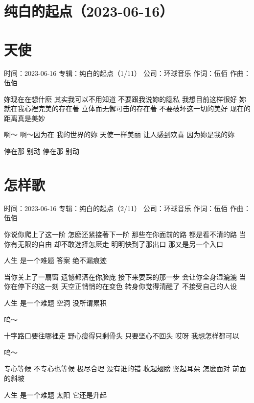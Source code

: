 \documentclass[UTF8,a4paper,oneside,twocolumn,12pt]{ctexbook}
\newcommand{\infopair}[2]{\textbullet #1：#2}
\newcommand{\zc}[1][伍佰]{\infopair{作词}{#1}}
\newcommand{\zq}[1][伍佰]{\infopair{作曲}{#1}}
\newcommand{\zj}[1]{\infopair{专辑}{#1}}
\newcommand{\sj}[1]{\infopair{时间}{#1}}
\newcommand{\gs}[1]{\infopair{公司}{#1}}
\newenvironment{info}{\begin{flushleft}\kaishu
	}
	{\end{flushleft}\normalsize\yahei\par}
\newenvironment{lyric}{
	}
{}
\begin{document}
\section*{纯白的起点（2023-06-16）}%
\section{天使}
\begin{info}
	\sj{2023-06-16}
	\zj{纯白的起点（1/11）}
	\gs{环球音乐}
	\zc
	\zq
\end{info}
\begin{lyric}
	妳现在在想什麽
	其实我可以不用知道
	不要跟我说妳的隐私
	我想目前这样很好
	妳就在我心裡完美的存在著
	立体而无懈可击的存在著
	不要破坏这一切的美好
	现在的距离真是美妙

	啊～
	啊～因为在
	我的世界的妳
	天使一样美丽
	让人感到欢喜
	因为妳是我的妳

	停在那
	别动
	停在那
	别动
\end{lyric}

\section{怎样歌}%
\begin{info}
	\sj{2023-06-16}
	\zj{纯白的起点（2/11）}
	\gs{环球音乐}
	\zc
	\zq
\end{info}
\begin{lyric}
	你说你爬上了这一阶 怎麽还紧接著下一阶
	那些在你面前的路 都是看不清的路
	当你有无限的自由 却不敢选择怎麽走
	明明快到了那出口 那又是另一个入口

	人生 是一个难题
	答案 绝不漏痕迹

	当你关上了一扇窗 遗憾都洒在你脸庞
	接下来要踩的那一步 会让你全身湿漉漉
	当你在停下的这一刻 天空正悄悄的在变色
	转身你觉得清醒了 不接受自己的人设

	人生 是一个难题
	空洞 没所谓累积

	呜～

	十字路口要往哪裡走
	野心瘦得只剩骨头
	只要坚心不回头 哎呀
	我想怎样都可以

	呜～

	专心等候 不专心也等候
	极尽合理 没有谁的错
	收起翅膀 竖起耳朵
	怎麽面对 前面的斜坡

	人生 是一个难题
	太阳 它还是升起
\end{lyric}
\end{document}
